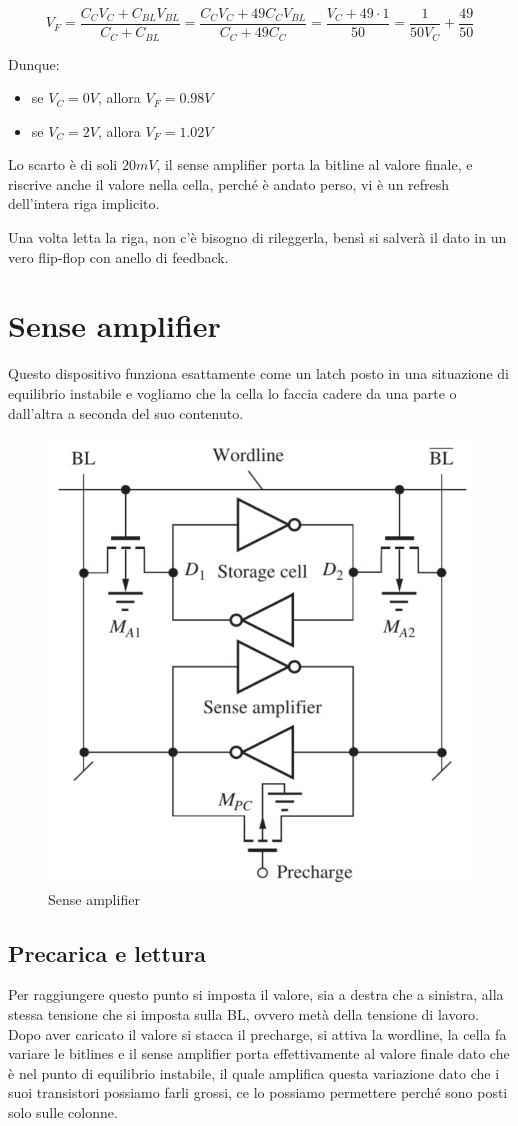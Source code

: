 \begin{equation*}
    V_F = \frac{ C_CV_C + C_{BL}V_{BL}}{C_C + C_{BL}} = \frac{ C_CV_C + 49 C_CV_{BL}}{C_C + 49 C_C} = \frac{V_C+49\cdot1}{50} = \frac{1}{50V_C} + \frac{49}{50}
\end{equation*}

Dunque:

\begin{itemize}
    \item[] se $V_C = 0V$, allora $V_F = 0.98V$
    \item[] se $V_C = 2V$, allora $V_F = 1.02V$
\end{itemize}

Lo scarto è di soli $20mV$, il sense amplifier porta la bitline al valore finale, e riscrive anche il valore nella cella, perché è andato perso, vi è un refresh dell'intera riga implicito.

Una volta letta la riga, non c'è bisogno di rileggerla, bensì si salverà il dato in un vero flip-flop con anello di feedback.

\newpage
\chapter{Sense amplifier}
Questo dispositivo funziona esattamente come un latch posto in una situazione di equilibrio instabile e vogliamo che la cella lo faccia cadere da una parte o dall'altra a seconda del suo contenuto.

\begin{figure}[htbp]
    \centering
    \includegraphics[width=0.4\linewidth]{img/Sense_amp.png}
    \caption{Sense amplifier}
\end{figure}

\section{Precarica e lettura}

Per raggiungere questo punto si imposta il valore, sia a destra che a sinistra, alla stessa tensione che si imposta sulla BL, ovvero metà della tensione di lavoro. Dopo aver caricato il valore si stacca il precharge, si attiva la wordline, la cella fa variare le bitlines e il sense amplifier porta effettivamente al valore finale dato che è nel punto di equilibrio instabile, il quale amplifica questa variazione dato che i suoi transistori possiamo farli grossi, ce lo possiamo permettere perché sono posti solo sulle colonne.


